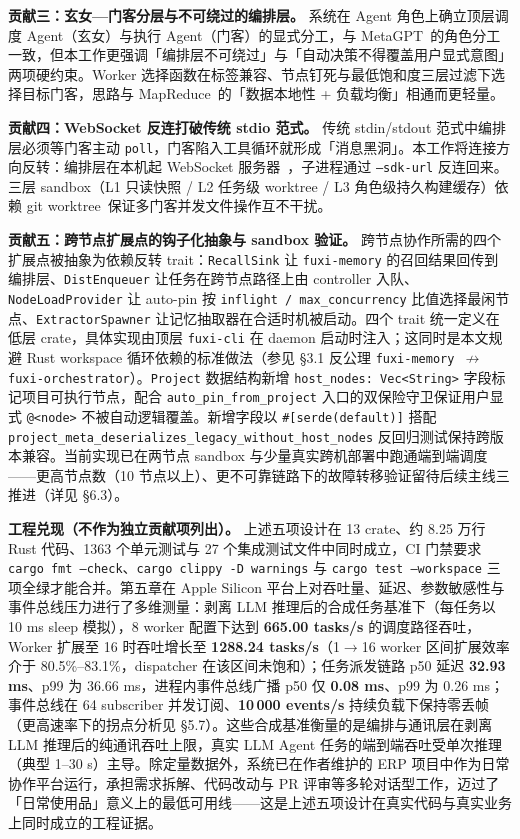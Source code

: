 \textbf{贡献三：玄女—门客分层与不可绕过的编排层。} 系统在 Agent 角色上确立顶层调度 Agent（玄女）与执行 Agent（门客）的显式分工，与 MetaGPT~\parencite{hong2023metagpt}的角色分工一致，但本工作更强调「编排层不可绕过」与「自动决策不得覆盖用户显式意图」两项硬约束。Worker 选择函数在标签兼容、节点钉死与最低饱和度三层过滤下选择目标门客，思路与 MapReduce~\parencite{dean2004mapreduce}的「数据本地性 + 负载均衡」相通而更轻量。

\textbf{贡献四：WebSocket 反连打破传统 stdio 范式。} 传统 stdin/stdout 范式中编排层必须等门客主动 \texttt{poll}，门客陷入工具循环就形成「消息黑洞」。本工作将连接方向反转：编排层在本机起 WebSocket 服务器~\parencite{fette2011websocket}，子进程通过 \texttt{--sdk-url} 反连回来。三层 sandbox（L1 只读快照 / L2 任务级 worktree / L3 角色级持久构建缓存）依赖 git worktree~\parencite{git2024worktree}保证多门客并发文件操作互不干扰。

\textbf{贡献五：跨节点扩展点的钩子化抽象与 sandbox 验证。} 跨节点协作所需的四个扩展点被抽象为依赖反转 trait：\texttt{RecallSink} 让 \texttt{fuxi-memory} 的召回结果回传到编排层、\texttt{DistEnqueuer} 让任务在跨节点路径上由 controller 入队、\texttt{NodeLoadProvider} 让 auto-pin 按 \texttt{inflight / max\_concurrency} 比值选择最闲节点、\texttt{ExtractorSpawner} 让记忆抽取器在合适时机被启动。四个 trait 统一定义在低层 crate，具体实现由顶层 \texttt{fuxi-cli} 在 daemon 启动时注入；这同时是本文规避 Rust workspace 循环依赖的标准做法（参见 §3.1 反公理 \texttt{fuxi-memory $\not\to$ fuxi-orchestrator}）。\texttt{Project} 数据结构新增 \texttt{host\_nodes: Vec<String>} 字段标记项目可执行节点，配合 \texttt{auto\_pin\_from\_project} 入口的双保险守卫保证用户显式 \texttt{@<node>} 不被自动逻辑覆盖。新增字段以 \texttt{\#[serde(default)]} 搭配 \texttt{project\_meta\_deserializes\_legacy\_without\_host\_nodes} 反回归测试保持跨版本兼容。当前实现已在两节点 sandbox 与少量真实跨机部署中跑通端到端调度——更高节点数（10 节点以上）、更不可靠链路下的故障转移验证留待后续主线三推进（详见 §6.3）。

\textbf{工程兑现（不作为独立贡献项列出）。} 上述五项设计在 13 crate、约 8.25 万行 Rust 代码、1363 个单元测试与 27 个集成测试文件中同时成立，CI 门禁要求 \texttt{cargo fmt --check}、\texttt{cargo clippy -D warnings} 与 \texttt{cargo test --workspace} 三项全绿才能合并。第五章在 Apple Silicon 平台上对吞吐量、延迟、参数敏感性与事件总线压力进行了多维测量：剥离 LLM 推理后的合成任务基准下（每任务以 10 ms sleep 模拟），8 worker 配置下达到 \textbf{665.00 tasks/s} 的调度路径吞吐，Worker 扩展至 16 时吞吐增长至 \textbf{1288.24 tasks/s}（1$\rightarrow$16 worker 区间扩展效率介于 80.5\%--83.1\%，dispatcher 在该区间未饱和）；任务派发链路 p50 延迟 \textbf{32.93 ms}、p99 为 36.66 ms，进程内事件总线广播 p50 仅 \textbf{0.08 ms}、p99 为 0.26 ms；事件总线在 64 subscriber 并发订阅、\textbf{10\,000 events/s} 持续负载下保持零丢帧（更高速率下的拐点分析见 §5.7）。这些合成基准衡量的是编排与通讯层在剥离 LLM 推理后的纯通讯吞吐上限，真实 LLM Agent 任务的端到端吞吐受单次推理（典型 1--30 s）主导。除定量数据外，系统已在作者维护的 ERP 项目中作为日常协作平台运行，承担需求拆解、代码改动与 PR 评审等多轮对话型工作，迈过了「日常使用品」意义上的最低可用线——这是上述五项设计在真实代码与真实业务上同时成立的工程证据。

